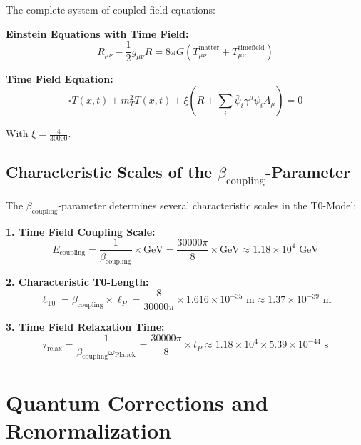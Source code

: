 \documentclass[12pt,a4paper]{report}
\newcommand{\Tfield}{T(x,t)}  %
\newcommand{\xipar}{\xi}      %
\begin{document}
	The complete system of coupled field equations:
	
	\textbf{Einstein Equations with Time Field:}
	\begin{equation}\label{eq:einstein_timefield}
		R_{\mu\nu} - \frac{1}{2} g_{\mu\nu} R = 8\pi G \left(T_{\mu\nu}^{\text{matter}} + T_{\mu\nu}^{\text{timefield}}\right)
	\end{equation}
	
	\textbf{Time Field Equation:}
	\begin{equation}\label{eq:timefield_equation_complete}
		\square \Tfield + m_T^2 \Tfield + \xipar \left(R + \sum_i \bar{\psi}_i \gamma^\mu \psi_i A_\mu\right) = 0
	\end{equation}
	
	With $\xipar = \frac{4}{30000}$.
	
	\subsection{Characteristic Scales of the $\beta_{\text{coupling}}$-Parameter}\label{subsec:characteristic_scales_beta}
	
	The $\beta_{\text{coupling}}$-parameter determines several characteristic scales in the T0-Model:
	
	\textbf{1. Time Field Coupling Scale:}
	\begin{equation}
		E_{\text{coupling}} = \frac{1}{\beta_{\text{coupling}}} \times \text{GeV} = \frac{30000\pi}{8} \times \text{GeV} \approx 1.18 \times 10^{4} \text{ GeV}
	\end{equation}
	
	\textbf{2. Characteristic T0-Length:}
	\begin{equation}
		\ell_{\text{T0}} = \beta_{\text{coupling}} \times \ell_P = \frac{8}{30000\pi} \times 1.616 \times 10^{-35} \text{ m} \approx 1.37 \times 10^{-39} \text{ m}
	\end{equation}
	
	\textbf{3. Time Field Relaxation Time:}
	\begin{equation}
		\tau_{\text{relax}} = \frac{1}{\beta_{\text{coupling}} \omega_{\text{Planck}}} = \frac{30000\pi}{8} \times t_P \approx 1.18 \times 10^{4} \times 5.39 \times 10^{-44} \text{ s}
	\end{equation}
	
	\section{Quantum Corrections and Renormalization}\label{sec:quantum_corrections_renormalization}
	
\end{document}
